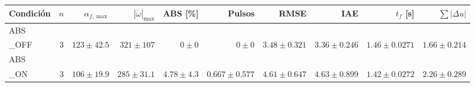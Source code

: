 \begin{tabular}{lrrrrrrrrr}
\hline
Condici\'on & $n$ & $\alpha_{f,\max}$ & $|\dot{\omega}|_{\max}$ & ABS [\%] & Pulsos & RMSE & IAE & $t_f$ [s] & $\sum|\Delta u|$ \\
\hline
ABS\\_OFF & 3 & $123 \pm 42.5$ & $321 \pm 107$ & $0 \pm 0$ & $0 \pm 0$ & $3.48 \pm 0.321$ & $3.36 \pm 0.246$ & $1.46 \pm 0.0271$ & $1.66 \pm 0.214$ \\
ABS\\_ON & 3 & $106 \pm 19.9$ & $285 \pm 31.1$ & $4.78 \pm 4.3$ & $0.667 \pm 0.577$ & $4.61 \pm 0.647$ & $4.63 \pm 0.899$ & $1.42 \pm 0.0272$ & $2.26 \pm 0.289$ \\
\hline
\end{tabular}
